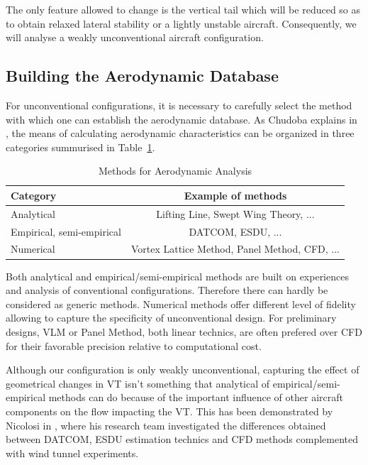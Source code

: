 The only feature allowed to change is the vertical tail which will be reduced so as to obtain relaxed lateral stability or a lightly unstable aircraft. Consequently, we will analyse a weakly unconventional aircraft configuration.

\subsection{Building the Aerodynamic Database}
For unconventional configurations, it is necessary to carefully select the method with which one can establish the aerodynamic database. As Chudoba explains in \cite{ChudobaUnconventionalConf}, the means of calculating aerodynamic characteristics can be organized in three categories summurised in Table~\ref{tab:aeroAnalysis}.
\begin{table}[hbt!]
	\caption{\label{tab:aeroAnalysis} Methods for Aerodynamic Analysis \cite{Chudoba_generic_method}}
	\centering
	\begin{tabular}{l|c}
		Category & Example of methods\\
		\hline
		Analytical & Lifting Line, Swept Wing Theory, ...\\
		Empirical, semi-empirical & DATCOM, ESDU, ...\\ 
		Numerical & Vortex Lattice Method, Panel Method, CFD, ...\\
	\end{tabular}
\end{table}

Both analytical and empirical/semi-empirical methods are built on experiences and analysis of conventional configurations. Therefore there can hardly be considered as generic methods. Numerical methods offer different level of fidelity allowing to capture the specificity of unconventional design. For preliminary designs, VLM or Panel Method, both linear technics, are often prefered over CFD for their favorable precision relative to computational cost.

Although our configuration is only weakly unconventional, capturing the effect of geometrical changes in VT isn't something that analytical of empirical/semi-empirical methods can do because of the important influence of other aircraft components on the flow impacting the VT. This has been demonstrated by Nicolosi in \cite{NicolosiInvestigationVertical}, where his research team investigated the differences obtained between DATCOM, ESDU estimation technics and CFD methods complemented with wind tunnel experiments.

